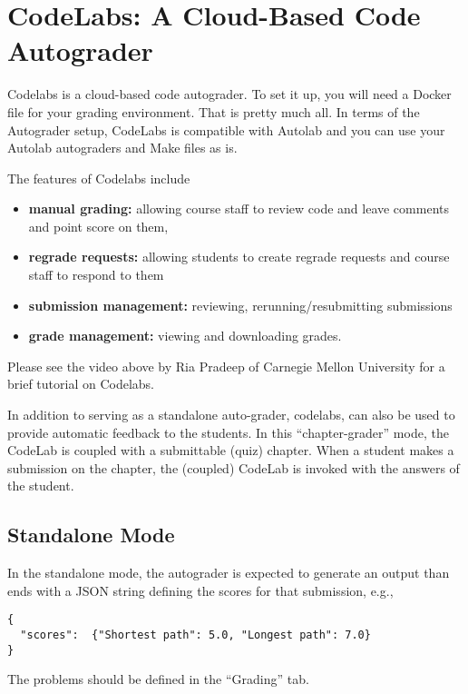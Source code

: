\chapter{CodeLabs: A Cloud-Based Code Autograder}
\label{ch:codelabs}

Codelabs is a cloud-based code autograder.  To set it up, you will
need a Docker file for your grading environment.  That is pretty much
all.  In terms of the Autograder setup, CodeLabs is compatible with
Autolab and you can use your Autolab autograders and Make files as is.

The features of Codelabs include
\begin{itemize}
\item  
\textbf{manual grading:} allowing course staff to review code and leave comments and point
score on them,

\item
\textbf{regrade requests:} allowing students to create regrade
requests and course staff to respond to them

\item
  \textbf{submission management:} reviewing, rerunning/resubmitting submissions

\item
  \textbf{grade management:} viewing and downloading grades.
\end{itemize}
%
Please see the video above by Ria Pradeep of Carnegie Mellon University for a brief tutorial on Codelabs.

In addition to serving as a standalone auto-grader, codelabs, can also
be used to provide automatic feedback to the students.
%
In this ``chapter-grader'' mode, the CodeLab is coupled with a submittable
(quiz) chapter.
%
When a student makes a submission on the chapter, the (coupled) CodeLab is invoked with the answers of the student.

\section{Standalone Mode}
\label{sec:codelabs::standalone}

\begin{gram}
\label{sec:codelabs::standalone::output}

In the standalone mode, the autograder is expected to generate an output than ends with a JSON string defining the scores for that submission, e.g.,
  
\begin{lstlisting}
{
  "scores":  {"Shortest path": 5.0, "Longest path": 7.0}
}
\end{lstlisting}

The problems should be defined in the ``Grading'' tab.
\end{gram}


